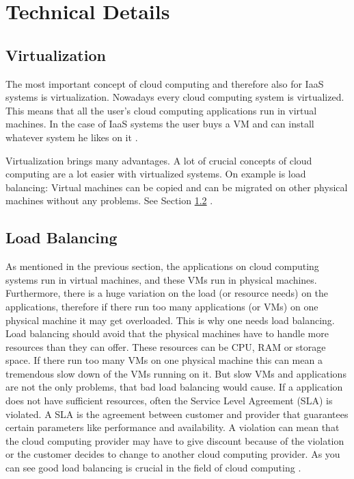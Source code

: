 \chapter{Technical Details}
\label{chap:implementation}

\section{Virtualization}
The most important concept of cloud computing and therefore also for IaaS systems is virtualization. Nowadays every cloud computing system is virtualized. This means that all the user's cloud computing applications run in virtual machines. In the case of IaaS systems the user buys a VM and can install whatever system he likes on it \cite{Arzuaga_2010}. 

Virtualization brings many advantages. A lot of crucial concepts of cloud computing are a lot easier with virtualized systems. On example is load balancing: Virtual machines can be copied and can be migrated on other physical machines without any problems. See Section \ref{sec:load_balancing} \cite{Arzuaga_2010}.

\section{Load Balancing}
\label{sec:load_balancing}
As mentioned in the previous section, the applications on cloud computing systems run in virtual machines, and these VMs run in physical machines. Furthermore, there is a huge variation on the load (or resource needs) on the applications, therefore if there run too many applications (or VMs) on one physical machine it may get overloaded. This is why one needs load balancing. Load balancing should avoid that the physical machines have to handle more resources than they can offer. These resources can be CPU, RAM or storage space. If there run too many VMs on one physical machine this can mean a tremendous slow down of the VMs running on it. But slow VMs and applications are not the only problems, that bad load balancing would cause. If a application does not have sufficient resources, often the Service Level Agreement (SLA) is violated. A SLA is the agreement between customer and provider that guarantees certain parameters like performance and availability. A violation can mean that the cloud computing provider may have to give discount because of the violation or the customer decides to change to another cloud computing provider. As you can see good load balancing is crucial in the field of cloud computing \cite{Chen_2014}. 

